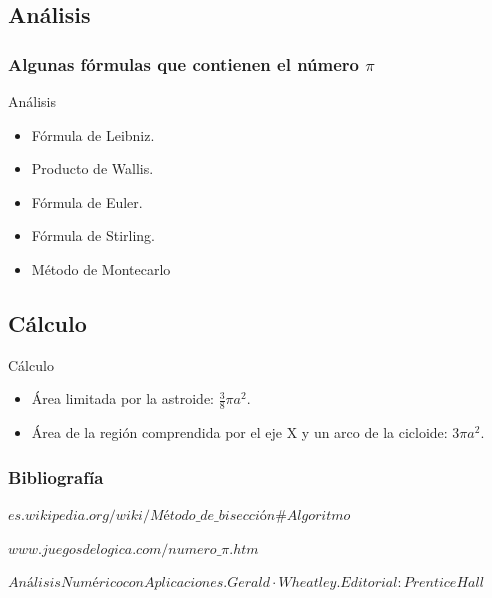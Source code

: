 \documentclass{beamer}
\begin{document}
\subsection{Análisis}
\begin{frame}
\frametitle{Algunas fórmulas que contienen el número $\pi$}
\begin{block}{Análisis}
\begin{itemize}
  \item Fórmula de Leibniz.
  \pause
  \item Producto de Wallis.
  \pause
  \item Fórmula de Euler.
  \pause
  \item Fórmula de Stirling.
  \pause
  \item Método de Montecarlo

\end{itemize}
\end{block}

\end{frame}

\subsection{Cálculo} 
\begin{frame}

\begin{block}{Cálculo}
\begin{itemize}
  \item Área limitada por la astroide: $\frac{3}{8}\pi a^2 $.
  \pause

  \item Área de la región comprendida por el eje X y un arco de la cicloide: $3 \pi a^2.$

\end{itemize}
\end{block}

\end{frame}

\begin{frame}
\frametitle{Bibliografía}
\begin{thebibliography}
  \beamertermplatebookbibitems
  {\small $es.wikipedia.org/wiki/Método\_de\_bisección\#Algoritmo$}
  
  \beamertermplatebookbibitems
  {\small $www.juegosdelogica.com/numero\_\pi.htm$}
  
  \beamertermplatebookbibitems
  {\small $Análisis Numérico con Aplicaciones. Gerald·Wheatley. Editorial: Prentice Hall$}
  
\end{thebibliography}
\end{frame}
\end{document}

